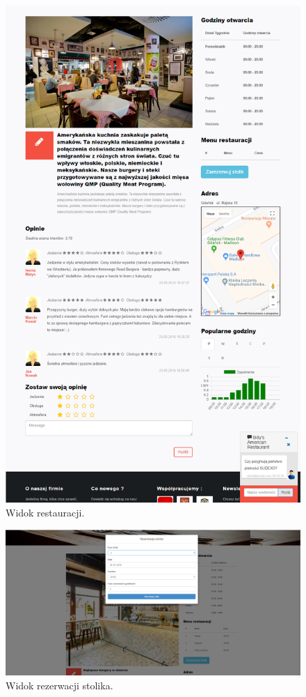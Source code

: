 \documentclass{article}
\begin{document}
\begin{figure}[H]
\centering
	\includegraphics[width=1.00\textwidth]{screens/restaurant.png}
	\caption[caption]{Widok restauracji.}
	\label{fig:restaurant}
\end{figure}

\begin{figure}[H]
\centering
	\includegraphics[width=1.00\textwidth]{screens/reservation.png}
	\caption[caption]{Widok rezerwacji stolika.}
	\label{fig:reservation}
\end{figure}
\end{document}
